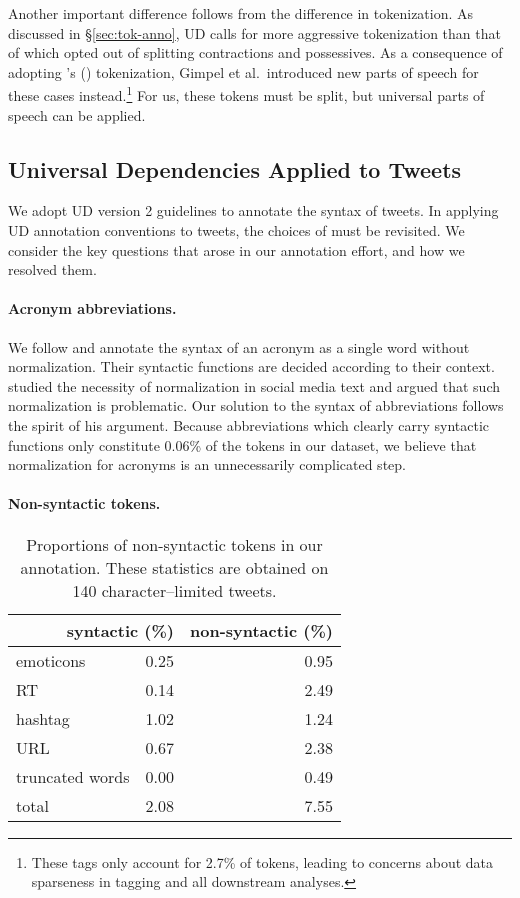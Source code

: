\documentclass[11pt,a4paper]{article}
\newcommand{\citeposs}[2][]{\citeauthor{#2}'s (\citeyear[#1]{#2})}
\begin{document}
Another important difference follows from the difference in
tokenization.  As discussed in \S\ref{sec:tok-anno}, UD calls for more
aggressive tokenization than that of \citet{ICWSM101540} which opted
out of splitting contractions and possessives. As a consequence of adopting \citeposs{ICWSM101540} tokenization, 
Gimpel et al.~introduced new parts of speech for these cases
instead.\footnote{These tags only account for 2.7\% of tokens,
  leading to concerns about data sparseness in tagging and all
  downstream analyses.}  For us, these tokens must be split, but
universal parts of speech can be applied.




\subsection{Universal Dependencies Applied to Tweets} \label{sec:ud-tweet}

We adopt UD version 2 guidelines to annotate the syntax of tweets.
In applying UD annotation conventions to tweets, the choices of 
 must be revisited.  We consider the
key questions that arose in our annotation effort, and how we resolved them.






\paragraph{Acronym abbreviations.}  We follow \citet{kong-EtAl:2014:EMNLP2014} and annotate the
syntax of an acronym as a single word without normalization. Their syntactic functions
are decided according to their context. \citet{eisenstein:2013:NAACL-HLT} studied the necessity of normalization
in social media text and argued that such normalization is problematic.
Our solution to the syntax of abbreviations follows the spirit of his argument. Because abbreviations which clearly carry
syntactic functions only constitute 0.06\% of the tokens in our
dataset, we believe that normalization for acronyms is an unnecessarily complicated
step.



\paragraph{Non-syntactic tokens.}  
\begin{table}
\centering
\begin{tabular}{lrr}
\multicolumn{2}{r}{syntactic (\%)} & non-syntactic (\%)\\ \hline
emoticons & 0.25 & 0.95 \\
RT & 0.14 & 2.49\\
hashtag & 1.02 & 1.24 \\
URL & 0.67 & 2.38 \\
truncated words & 0.00 & 0.49 \\
 \hline
 total & 2.08 & 7.55 \\
\end{tabular}
\caption{Proportions of non-syntactic tokens in our annotation. These statistics are obtained on 140 character--limited tweets. \label{tbl:non-synt-prop}}
\end{table}
\end{document}
